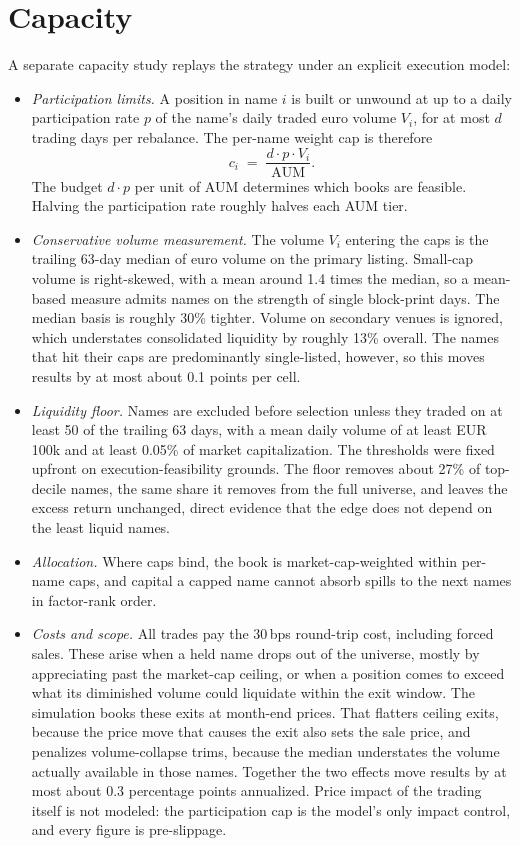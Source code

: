 \documentclass[11pt,a4paper]{article}
\begin{document}
\section{Capacity}
\label{sec:capacity}

A separate capacity study replays the strategy under an explicit execution
model:

\begin{itemize}
  \item \emph{Participation limits.} A position in name $i$ is built or
  unwound at up to a daily participation rate $p$ of the name's daily
  traded euro volume $V_i$, for at most $d$ trading days per rebalance.
  The per-name weight cap is therefore
  \[
    c_i \;=\; \frac{d \cdot p \cdot V_i}{\mathrm{AUM}}.
  \]
  The budget $d \cdot p$ per unit of AUM determines which books are
  feasible. Halving the participation rate roughly halves each AUM tier.
  \item \emph{Conservative volume measurement.} The volume $V_i$ entering
  the caps is the trailing 63-day median of euro volume on the
  primary listing. Small-cap volume is right-skewed, with a mean around 1.4 times
  the median, so a mean-based measure admits names on the strength of
  single block-print days. The median basis is roughly 30\% tighter.
  Volume on secondary venues is ignored, which understates consolidated
  liquidity by roughly 13\% overall. The names that hit their caps are
  predominantly single-listed, however, so this moves results by at most
  about 0.1 points per cell.
  \item \emph{Liquidity floor.} Names are excluded before selection
  unless they traded on at least 50 of the trailing 63 days, with a mean
  daily volume of at least EUR 100k and at least 0.05\% of market
  capitalization. The thresholds were fixed upfront on
  execution-feasibility grounds. The floor removes about 27\% of
  top-decile names, the same share it removes from the full universe, and
  leaves the excess return unchanged, direct evidence that the edge does
  not depend on the least liquid names.
  \item \emph{Allocation.} Where caps bind, the book is market-cap-weighted
  within per-name caps, and capital a capped name cannot absorb spills to
  the next names in factor-rank order.
  \item \emph{Costs and scope.} All trades pay the 30\,bps round-trip
  cost, including forced sales. These arise when a held name drops out of
  the universe, mostly by appreciating past the market-cap ceiling, or
  when a position comes to exceed what its diminished volume could
  liquidate within the exit window. The simulation books these exits at
  month-end prices. That flatters ceiling exits, because the price move
  that causes the exit also sets the sale price, and penalizes
  volume-collapse trims, because the median understates the volume
  actually available in those names. Together the two effects move
  results by at most about 0.3 percentage points annualized. Price impact
  of the trading itself is not modeled: the participation cap is the
  model's only impact control, and every figure is pre-slippage.
\end{itemize}
\end{document}

